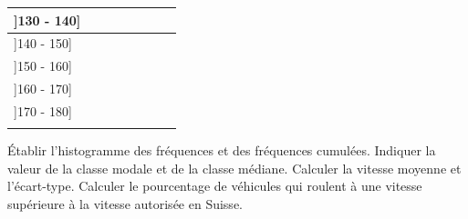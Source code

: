 \begin{exercice}
\begin{landscape}
\begin{tabular}{llllllll}
\multicolumn{1}{|l|}{{]}130 - 140{]}}                                            & \multicolumn{1}{l|}{}          & \multicolumn{1}{l|}{}          & \multicolumn{1}{l|}{}          & \multicolumn{1}{l|}{}          & \multicolumn{1}{l|}{}            & \multicolumn{1}{l|}{}          & \multicolumn{1}{l|}{}             \\ \hline
\multicolumn{1}{|l|}{{]}140 - 150{]}}                                            & \multicolumn{1}{l|}{}          & \multicolumn{1}{l|}{}          & \multicolumn{1}{l|}{}          & \multicolumn{1}{l|}{}          & \multicolumn{1}{l|}{}            & \multicolumn{1}{l|}{}          & \multicolumn{1}{l|}{}             \\ \hline
\multicolumn{1}{|l|}{{]}150 - 160{]}}                                            & \multicolumn{1}{l|}{}          & \multicolumn{1}{l|}{}          & \multicolumn{1}{l|}{}          & \multicolumn{1}{l|}{}          & \multicolumn{1}{l|}{}            & \multicolumn{1}{l|}{}          & \multicolumn{1}{l|}{}             \\ \hline
\multicolumn{1}{|l|}{{]}160 - 170{]}}                                            & \multicolumn{1}{l|}{}          & \multicolumn{1}{l|}{}          & \multicolumn{1}{l|}{}          & \multicolumn{1}{l|}{}          & \multicolumn{1}{l|}{}            & \multicolumn{1}{l|}{}          & \multicolumn{1}{l|}{}             \\ \hline
\multicolumn{1}{|l|}{{]}170 - 180{]}}                                            & \multicolumn{1}{l|}{}          & \multicolumn{1}{l|}{}          & \multicolumn{1}{l|}{}          & \multicolumn{1}{l|}{}          & \multicolumn{1}{l|}{}            & \multicolumn{1}{l|}{}          & \multicolumn{1}{l|}{}             \\ \hline
                                                                                 & \multicolumn{1}{l|}{}          & \multicolumn{1}{l|}{}          & \multicolumn{1}{l|}{}          &                                & \multicolumn{1}{l|}{}            & \multicolumn{1}{l|}{}          & \multicolumn{1}{l|}{}             \\ \cline{3-4} \cline{7-8} 
\end{tabular}

\end{landscape}

Établir l'histogramme des fréquences et des fréquences cumulées.
Indiquer la valeur de la classe modale et de la classe médiane.
Calculer la vitesse moyenne et l'écart-type.
Calculer le pourcentage de véhicules qui roulent à une vitesse supérieure à la vitesse autorisée en Suisse.
\end{exercice}

